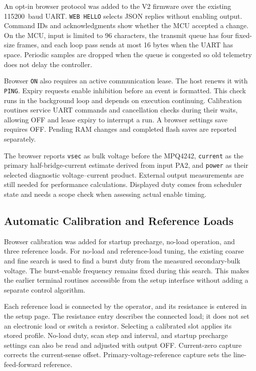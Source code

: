 An opt-in browser protocol was added to the V2 firmware over the existing \SI{115200}{baud} UART. \texttt{WEB HELLO} selects JSON replies without enabling output. Command IDs and acknowledgments show whether the MCU accepted a change. On the MCU, input is limited to 96 characters, the transmit queue has four fixed-size frames, and each loop pass sends at most 16 bytes when the UART has space. Periodic samples are dropped when the queue is congested so old telemetry does not delay the controller.

Browser \texttt{ON} also requires an active communication lease. The host renews it with \texttt{PING}. Expiry requests enable inhibition before an event is formatted. This check runs in the background loop and depends on execution continuing. Calibration routines service UART commands and cancellation checks during their waits, allowing OFF and lease expiry to interrupt a run. A browser settings save requires OFF. Pending RAM changes and completed flash saves are reported separately.

The browser reports \texttt{vsec} as bulk voltage before the MPQ4242, \texttt{current} as the primary half-bridge-current estimate derived from input PA2, and \texttt{power} as their selected diagnostic voltage--current product. External output measurements are still needed for performance calculations. Displayed duty comes from scheduler state and needs a scope check when assessing actual enable timing.

\subsection{Automatic Calibration and Reference Loads}

Browser calibration was added for startup precharge, no-load operation, and three reference loads. For no-load and reference-load tuning, the existing coarse and fine search is used to find a burst duty from the measured secondary-bulk voltage. The burst-enable frequency remains fixed during this search. This makes the earlier terminal routines accessible from the setup interface without adding a separate control algorithm.

Each reference load is connected by the operator, and its resistance is entered in the setup page. The resistance entry describes the connected load; it does not set an electronic load or switch a resistor. Selecting a calibrated slot applies its stored profile. No-load duty, scan step and interval, and startup precharge settings can also be read and adjusted with output OFF. Current-zero capture corrects the current-sense offset. Primary-voltage-reference capture sets the line-feed-forward reference.

